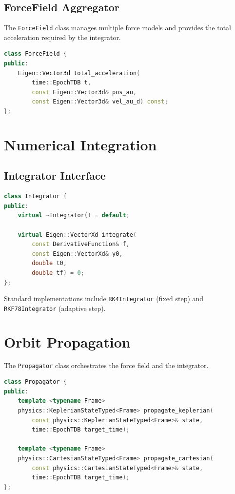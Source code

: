 \subsection{ForceField Aggregator}

The \texttt{ForceField} class manages multiple force models and provides the total acceleration required by the integrator.

\begin{lstlisting}[language=C++]
class ForceField {
public:
    Eigen::Vector3d total_acceleration(
        time::EpochTDB t, 
        const Eigen::Vector3d& pos_au, 
        const Eigen::Vector3d& vel_au_d) const;
};
\end{lstlisting}

\section{Numerical Integration}

\subsection{Integrator Interface}

\begin{lstlisting}[language=C++]
class Integrator {
public:
    virtual ~Integrator() = default;
    
    virtual Eigen::VectorXd integrate(
        const DerivativeFunction& f,
        const Eigen::VectorXd& y0,
        double t0,
        double tf) = 0;
};
\end{lstlisting}

Standard implementations include \texttt{RK4Integrator} (fixed step) and \texttt{RKF78Integrator} (adaptive step).

\section{Orbit Propagation}

The \texttt{Propagator} class orchestrates the force field and the integrator.

\begin{lstlisting}[language=C++]
class Propagator {
public:
    template <typename Frame>
    physics::KeplerianStateTyped<Frame> propagate_keplerian(
        const physics::KeplerianStateTyped<Frame>& state,
        time::EpochTDB target_time);

    template <typename Frame>
    physics::CartesianStateTyped<Frame> propagate_cartesian(
        const physics::CartesianStateTyped<Frame>& state,
        time::EpochTDB target_time);
};
\end{lstlisting}

